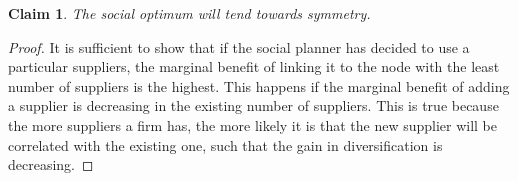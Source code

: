 \documentclass[american, abstract=on]{scrartcl}
\theoremstyle{plain}
\newtheorem{claim}{Claim}
\begin{document}
\begin{claim}
    The social optimum will tend towards symmetry.
\end{claim}

\begin{proof}
    It is sufficient to show that if the social planner has decided to use a particular suppliers, the marginal benefit of linking it to the node with the least number of suppliers is the highest. This happens if the marginal benefit of adding a supplier is decreasing in the existing number of suppliers. This is true because the more suppliers a firm has, the more likely it is that the new supplier will be correlated with the existing one, such that the gain in diversification is decreasing.
\end{proof}
\end{document}
